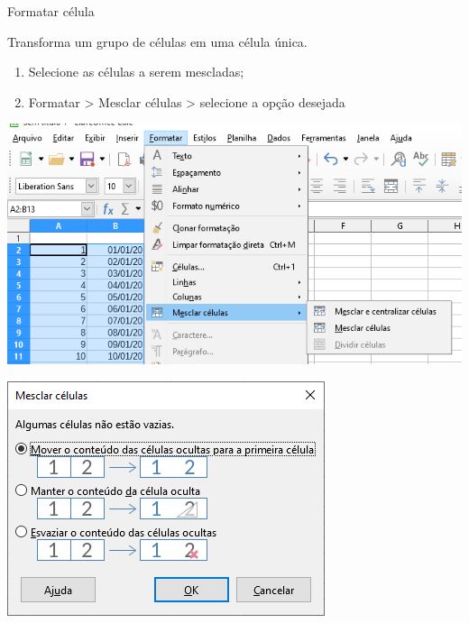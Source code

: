 \begin{frame}{Formatar célula}
	\begin{block}{}
		Transforma um grupo de células em uma célula única.
		\begin{enumerate}
			\item Selecione as células a serem mescladas;
			\item Formatar > Mesclar células > selecione a opção desejada
		\end{enumerate}
	\end{block}
	
	\medskip
	
	\begin{minipage}{0.49\linewidth}
		\centering
		\includegraphics[width=1\linewidth]{Figuras/Ch06/fig28}
	\end{minipage}\hfill
	\begin{minipage}{0.49\linewidth}
		\centering
		\includegraphics[width=1\linewidth]{Figuras/Ch06/fig29}
	\end{minipage}
\end{frame}


